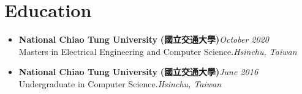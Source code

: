 \section{\sectionheading Education}

\begin{itemize}[leftmargin=0pt, label={}]%

\item{
{\sectionheading\large{\textbf{National Chiao Tung University}}} \textbf{(國立交通大學)}\hfill {\sectionheading\small{\textit{October 2020}}}\\
{\sectionheading\small{Masters in Electrical Engineering and Computer Science.}}\hfill {\sectionheading\small{\textit{Hsinchu, Taiwan}}}

}
\item{
{\sectionheading\large{\textbf{National Chiao Tung University}}} \textbf{(國立交通大學)}\hfill {\sectionheading\small{\textit{June 2016}}}\\
{\sectionheading\small{Undergraduate in Computer Science.}}\hfill {\sectionheading\small{\textit{Hsinchu, Taiwan}}}

}

\end{itemize}
